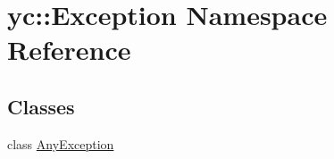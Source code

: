 \hypertarget{namespaceyc_1_1_exception}{}\section{yc\+:\+:Exception Namespace Reference}
\label{namespaceyc_1_1_exception}
\subsection*{Classes}
\begin{DoxyCompactItemize}
\item 
class \hyperlink{classyc_1_1_exception_1_1_any_exception}{Any\+Exception}
\end{DoxyCompactItemize}
